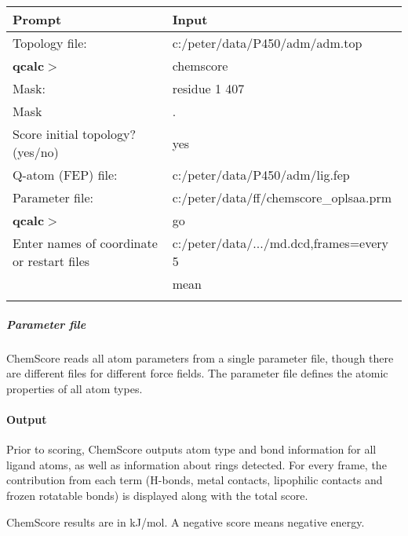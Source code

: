 \documentclass[a4paper,10pt]{article}
\begin{document}
  \begin{minipage}[t]{1.0\textwidth}
    \centering
    \begin{tabular}{ll}
      Prompt                        & Input     \\
      \hline
      Topology file:                & c:/peter/data/P450/adm/adm.top  \\
      \textbf{qcalc}$>$                        & chemscore    \\
      Mask:                         & residue 1 407       \\
      Mask                          & .         \\

      Score initial topology? (yes/no) & yes                                  \\
      Q-atom (FEP) file:               & c:/peter/data/P450/adm/lig.fep  \\
      Parameter file:                  & c:/peter/data/ff/chemscore\_oplsaa.prm \\
      \textbf{qcalc}$>$                         & go                                   \\
      Enter names of coordinate or restart files & c:/peter/data/.../md.dcd,frames=every 5                                \\
                                   &  mean                                \\
      \hline
        & \\
    \end{tabular}
    \label{xinput}
  \end{minipage}

  \subparagraph{Parameter file}
  ChemScore reads all atom parameters from a single parameter file, though there are different files for different force fields. The parameter file defines the atomic properties of all atom types.

  \paragraph{Output}
  Prior to scoring, ChemScore outputs atom type and bond information for all ligand atoms, as well as information about rings detected. For every frame, the contribution from each term (H-bonds, metal contacts, lipophilic contacts and frozen rotatable bonds) is displayed along with the total score.

  ChemScore results are in kJ/mol. A negative score means negative energy.
\end{document}
